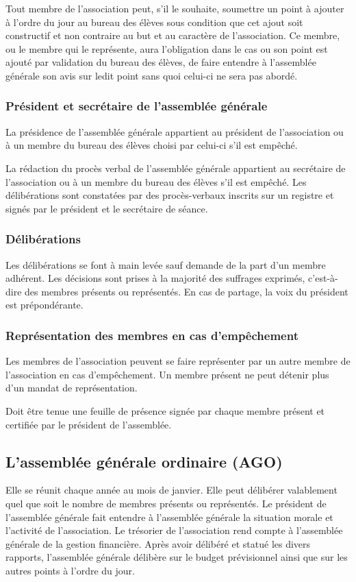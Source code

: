 \documentclass{article}
\begin{document}
				Tout membre de l'association peut, s'il le souhaite, soumettre
				un point à ajouter à l'ordre du jour au bureau des élèves sous
				condition que cet ajout soit constructif et non contraire au but
				et au caractère de l'association. Ce membre, ou le membre qui le
				représente, aura l'obligation dans le cas ou son point est
				ajouté par validation du bureau des élèves, de faire entendre à
				l'assemblée générale son avis sur ledit point sans quoi celui-ci
				ne sera pas abordé.

			\subsubsection{Président et secrétaire de l’assemblée générale}
				La présidence de l’assemblée générale appartient au président de
				l’association ou à un membre du bureau des élèves choisi par
				celui-ci s'il est empêché.

				La rédaction du procès verbal de l’assemblée générale appartient
				au secrétaire de l’association ou à un membre du bureau des
				élèves s’il est empêché. Les délibérations sont constatées par
				des procès-verbaux inscrits sur un registre et signés par le
				président et le secrétaire de séance.

			\subsubsection{Délibérations}
				Les délibérations se font à main levée sauf demande de la part
				d’un membre adhérent. Les décisions sont prises à la majorité
				des suffrages exprimés, c’est-à-dire des membres présents ou
				représentés. En cas de partage, la voix du président est
				prépondérante.

			\subsubsection{Représentation des membres en cas d’empêchement}
				Les membres de l’association peuvent se faire représenter par un
				autre membre de l’association en cas d’empêchement. Un membre
				présent ne peut détenir plus d’un mandat de représentation.

				Doit être tenue une feuille de présence signée par chaque membre
				présent et certifiée par le président de l’assemblée.

		\subsection{L’assemblée générale ordinaire (AGO)}
			Elle se réunit chaque année au mois de janvier. Elle peut délibérer
			valablement quel que soit le nombre de membres présents ou
			représentés. Le président de l’assemblée générale fait entendre à
			l’assemblée générale la situation morale et l’activité de
			l’association. Le trésorier de l’association rend compte à
			l’assemblée générale de la gestion financière. Après avoir délibéré
			et statué les divers rapports, l’assemblée générale délibère sur le
			budget prévisionnel ainsi que sur les autres points à l’ordre du
			jour.
\end{document}
